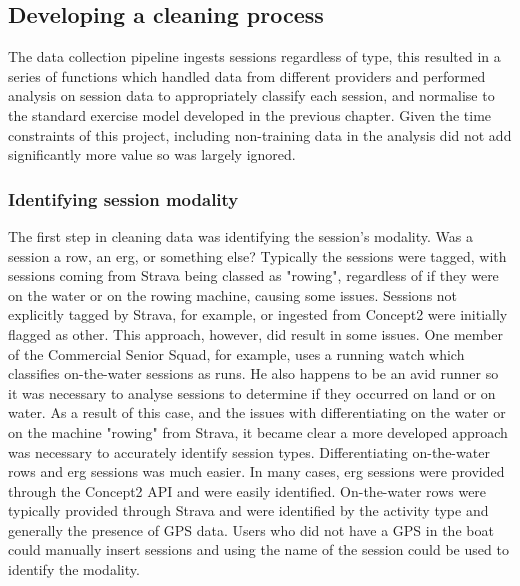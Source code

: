 \subsection{Developing a cleaning process}
The data collection pipeline ingests sessions regardless of type, this resulted in a series of functions which handled data from different providers and performed analysis on session data to appropriately classify each session, and normalise to the standard exercise model developed in the previous chapter. Given the time constraints of this project, including non-training data in the analysis did not add significantly more value so was largely ignored. 

\subsubsection{Identifying session modality}
The first step in cleaning data was identifying the session's modality. Was a session a row, an erg, or something else? Typically the sessions were tagged, with sessions coming from Strava being classed as "rowing", regardless of if they were on the water or on the rowing machine, causing some issues. Sessions not explicitly tagged by Strava, for example, or ingested from Concept2 were initially flagged as other. This approach, however, did result in some issues. One member of the Commercial Senior Squad, for example, uses a running watch which classifies on-the-water sessions as runs. He also happens to be an avid runner so it was necessary to analyse sessions to determine if they occurred on land or on water. As a result of this case, and the issues with differentiating on the water or on the machine "rowing" from Strava, it became clear a more developed approach was necessary to accurately identify session types. Differentiating on-the-water rows and erg sessions was much easier. In many cases, erg sessions were provided through the Concept2 API and were easily identified. On-the-water rows were typically provided through Strava and were identified by the activity type and generally the presence of GPS data. Users who did not have a GPS in the boat could manually insert sessions and using the name of the session could be used to identify the modality.



